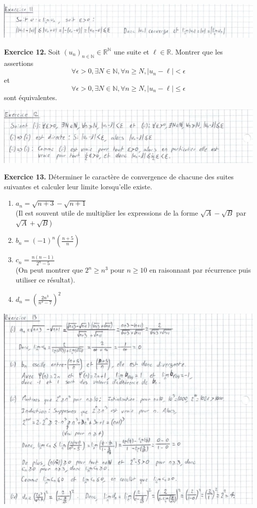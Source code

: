 \documentclass[a4paper, 10pt]{report}
\providecommand{\abs}[1]{\lvert#1\rvert}
\begin{document}
	\includegraphics{ex11.jpg}
	
	\newpage
	
	\noindent
	\textbf{Exercice 12.}  Soit
	$(u_n)_{n \in \mathbb{N}} \in \mathbb{R}^{\mathbb{N}}$ une suite et
	$\ell \in \mathbb{R}$. Montrer que les assertions
	\[\forall \epsilon > 0, \exists N \in \mathbb{N}, \forall n \geq N,
		\abs{u_n - \ell} < \epsilon\]
	et
	\[\forall \epsilon > 0, \exists N \in \mathbb{N}, \forall n \geq N,
		\abs{u_n - \ell} \leq \epsilon\]
	sont équivalentes.
	
	\includegraphics{ex12.jpg}
	
	\vspace{5mm}	
	\noindent
	\textbf{Exercice 13.} Déterminer le caractère de convergence de
	chacune des suites suivantes et calculer leur limite lorsqu'elle
	existe.
	\begin{enumerate}[label=(\roman*)]
		\item $a_n = \sqrt{n + 3} - \sqrt{n + 1}$ \\
		(Il est souvent utile de multiplier les expressions de la forme
		$\sqrt{A} - \sqrt{B}$ par $\sqrt{A} + \sqrt{B}$)
		\item $\displaystyle b_n = (-1)^n \left(\frac{n + 5}{n}\right)$
		\item $\displaystyle c_n = \frac{n(n-1)}{2^n - 5}$\\
		(On peut montrer que $2^n \geq n^3$ pour $n \geq 10$ en
		raisonnant par récurrence puis utiliser ce résultat).
		\item $\displaystyle d_n = \left(\frac{2n^3}{n^3 - 7}\right)^2$
	\end{enumerate}
	
	\includegraphics{ex13.jpg}
	
\end{document}
